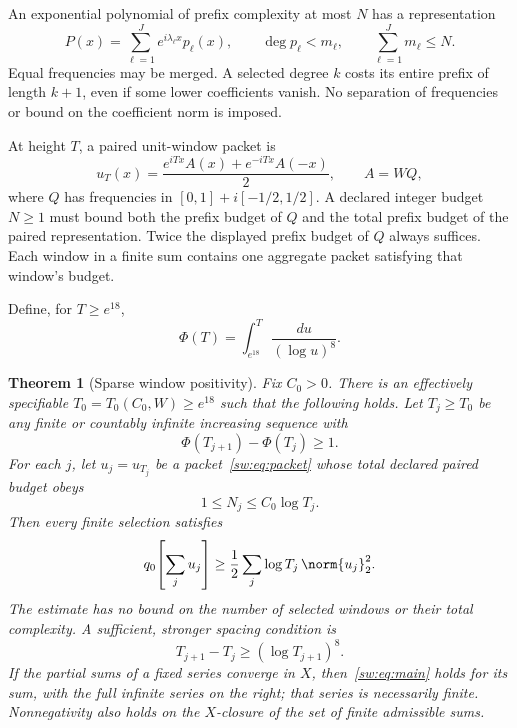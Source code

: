 \documentclass[11pt,a4paper]{article}
\numberwithin{equation}{section}
\newtheorem{theorem}{Theorem}[section]
\theoremstyle{definition}\newtheorem{definition}[theorem]{Definition}
\theoremstyle{remark}\newtheorem{remark}[theorem]{Remark}
\begin{document}
An exponential polynomial of prefix complexity at most $N$ has a representation
\begin{equation}\label{sw:eq:prefix}
 P(x)=\sum_{\ell=1}^J e^{i\lambda_\ell x}p_\ell(x),\qquad
 \deg p_\ell<m_\ell,\qquad \sum_{\ell=1}^Jm_\ell\le N.
\end{equation}
Equal frequencies may be merged. A selected degree $k$ costs its entire prefix of length $k+1$, even if some lower coefficients vanish. No separation of frequencies or bound on the coefficient norm is imposed.

At height $T$, a paired unit-window packet is
\begin{equation}\label{sw:eq:packet}
 u_T(x)=\frac{e^{iTx}A(x)+e^{-iTx}A(-x)}2,
 \qquad A=WQ,
\end{equation}
where $Q$ has frequencies in $[0,1]+i[-1/2,1/2]$. A declared integer budget $N\ge1$ must bound both the prefix budget of $Q$ and the total prefix budget of the paired representation. Twice the displayed prefix budget of $Q$ always suffices. Each window in a finite sum contains one aggregate packet satisfying that window's budget.

Define, for $T\ge e^{18}$,
\begin{equation}\label{sw:eq:Phi}
 \Phi(T)=\int_{e^{18}}^T\frac{du}{(\log u)^8}.
\end{equation}
\begin{theorem}[Sparse window positivity]\label{sw:thm:sparse}
Fix $C_0>0$. There is an effectively specifiable $T_0=T_0(C_0,W)\ge e^{18}$ such that the following holds. Let $T_j\ge T_0$ be any finite or countably infinite increasing sequence with
\begin{equation}\label{sw:eq:spacing}
 \Phi(T_{j+1})-\Phi(T_j)\ge1.
\end{equation}
For each $j$, let $u_j=u_{T_j}$ be a packet~\eqref{sw:eq:packet} whose total declared paired budget obeys
\begin{equation}\label{sw:eq:log-budget}
 1\le N_j\le C_0\log T_j.
\end{equation}
Then every finite selection satisfies
\begin{equation}\label{sw:eq:main}
 q_0\!\left[\sum_j u_j\right]
       \ge\frac12\sum_j\log T_j\,\norm{u_j}_2^2.
\end{equation}
The estimate has no bound on the number of selected windows or their total complexity. A sufficient, stronger spacing condition is
\begin{equation}\label{sw:eq:sufficient-spacing}
 T_{j+1}-T_j\ge(\log T_{j+1})^8.
\end{equation}
If the partial sums of a fixed series converge in $X$, then~\eqref{sw:eq:main} holds for its sum, with the full infinite series on the right; that series is necessarily finite. Nonnegativity also holds on the $X$-closure of the set of finite admissible sums.
\end{theorem}
\end{document}
